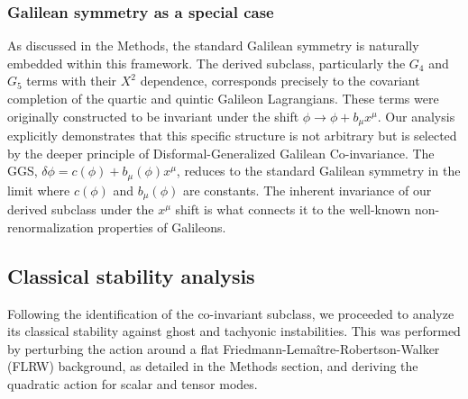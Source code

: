 \documentclass[twocolumn]{aastex631}
\begin{document}
\subsubsection{Galilean symmetry as a special case}
As discussed in the Methods, the standard Galilean symmetry is naturally embedded within this framework. The derived subclass, particularly the $G_4$ and $G_5$ terms with their $X^2$ dependence, corresponds precisely to the covariant completion of the quartic and quintic Galileon Lagrangians. These terms were originally constructed to be invariant under the shift $\phi \to \phi + b_\mu x^\mu$. Our analysis explicitly demonstrates that this specific structure is not arbitrary but is selected by the deeper principle of Disformal-Generalized Galilean Co-invariance. The GGS, $\delta \phi = c(\phi) + b_\mu(\phi) x^\mu$, reduces to the standard Galilean symmetry in the limit where $c(\phi)$ and $b_\mu(\phi)$ are constants. The inherent invariance of our derived subclass under the $x^\mu$ shift is what connects it to the well-known non-renormalization properties of Galileons.

\subsection{Classical stability analysis}
Following the identification of the co-invariant subclass, we proceeded to analyze its classical stability against ghost and tachyonic instabilities. This was performed by perturbing the action around a flat Friedmann-Lemaître-Robertson-Walker (FLRW) background, as detailed in the Methods section, and deriving the quadratic action for scalar and tensor modes.
\end{document}
